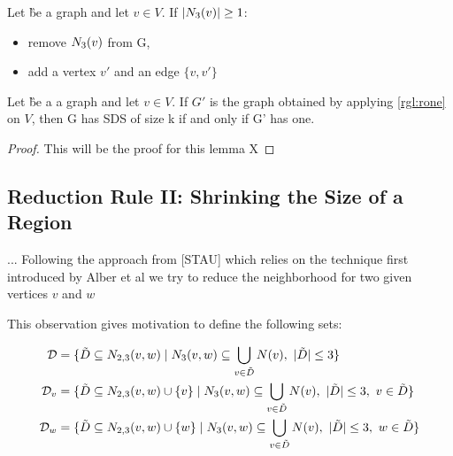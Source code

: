 \begin{rgl}\label{rgl:rone}
    Let \G be a graph and let $v \in V$. If $\abs{N_3(v)} \geq 1$:

    \begin{itemize}
        \item remove $N_3(v)$ from G, 
        \item add a vertex $v'$ and an edge $\{v, v'\}$
    \end{itemize}
     
\end{rgl}
\begin{lemma}
    Let \G be a a graph and let $v \in V$. If $G'$ is the graph obtained by applying \cref{rgl:rone}   on $V$, then G has SDS of size k if and only if G' has one.
\end{lemma}
\begin{proof}
   This will be the proof for this lemma X 
\end{proof}

\subsection{Reduction Rule II: Shrinking the Size of a Region}


...
Following the approach from [STAU] which relies on the technique first introduced by Alber et al we try to reduce the neighborhood for two given vertices $v$ and $w$

This observation gives motivation to define the following sets:

\begin{align}
    \mathcal{D} &= \{ \tilde D \subseteq N_{2,3}(v,w)            \mid N_3(v,w) \subseteq \bigcup_{v \in \tilde D} N(v),\ |\tilde D| \leq 3                  \}\\
    \mathcal{D}_{v}  &= \{ \tilde D \subseteq N_{2,3}(v,w) \cup \{v\} \mid N_3(v,w) \subseteq \bigcup_{v \in \tilde D} N(v),\ |\tilde D| \leq 3,\ v \in \tilde D \}\\
    \mathcal{D}_{w}  &= \{ \tilde D \subseteq N_{2,3}(v,w) \cup \{w\} \mid N_3(v,w) \subseteq \bigcup_{v \in \tilde D} N(v),\ |\tilde D| \leq 3,\ w \in \tilde D \}
    \end{align}

